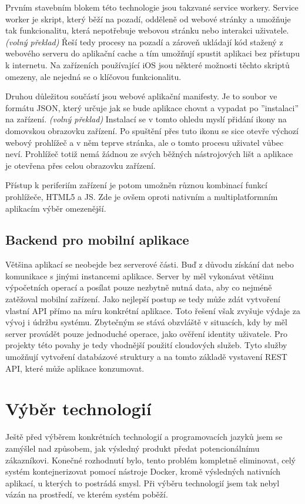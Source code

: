 \documentclass[
  glossaries,
]{kidiplom}
\begin{document}
Prvním stavebním blokem této technologie jsou takzvané service workery. Service worker je skript, který běží na pozadí, odděleně od webové stránky a umožňuje tak funkcionalitu, která nepotřebuje webovou stránku nebo interakci uživatele. \cite{6} \textit{(volný překlad)} Řeší tedy procesy na pozadí a zároveň ukládají kód stažený z webového serveru do aplikační cache a tím umožňují spustit aplikaci bez přístupu k internetu. Na zařízeních používající iOS jsou některé možnosti těchto skriptů omezeny, ale nejedná se o klíčovou funkcionalitu.

Druhou důležitou součástí jsou webové aplikační manifesty. Je to soubor ve formátu JSON, který určuje jak se bude aplikace chovat a vypadat po ''instalaci'' na zařízení. \cite{7} \textit{(volný překlad)} Instalací se v tomto ohledu myslí přidání ikony na domovskou obrazovku zařízení. Po spuštění přes tuto ikonu se sice otevře výchozí webový prohlížeč a v něm teprve stránka, ale o tomto procesu uživatel vůbec neví. Prohlížeč totiž nemá žádnou ze svých běžných nástrojových lišt a aplikace je otevřena přes celou obrazovku zařízení.

Přístup k periferiím zařízení je potom umožněn různou kombinací funkcí prohlížeče, HTML5 a JS. Zde je ovšem oproti nativním a multiplatformním aplikacím výběr omezenější.

\subsection{Backend pro mobilní aplikace}
Většina aplikací se neobejde bez serverové části. Buď z důvodu získání dat nebo komunikace s jinými instancemi aplikace. Server by měl vykonávat většinu výpočetních operací a posílat pouze nezbytně nutná data, aby co nejméně zatěžoval mobilní zařízení. Jako nejlepší postup se tedy může zdát vytvoření vlastní API přímo na míru konkrétní aplikace. Toto řešení však zvyšuje výdaje za vývoj i údržbu systému. Zbytečným se stává obzvláště v situacích, kdy by měl server provádět pouze jednoduché operace, jako ověření identity uživatele. Pro projekty této povahy je tedy vhodnější použití cloudových služeb. Tyto služby umožňují vytvoření databázové struktury a na tomto základě vystavení REST API, které může aplikace konzumovat.
\newpage

\section{Výběr technologií}
Ještě před výběrem konkrétních technologií a programovacích jazyků jsem se zamýšlel nad způsobem, jak výsledný produkt předat potencionálnímu zákazníkovi. Konečné rozhodnutí bylo, tento problém kompletně eliminovat, celý systém kontejnerizovat pomocí nástroje Docker, kromě výsledných nativních aplikací, u kterých to postrádá smysl. Při výběru technologií jsem tak nebyl vázán na prostředí, ve kterém systém poběží.
\end{document}
